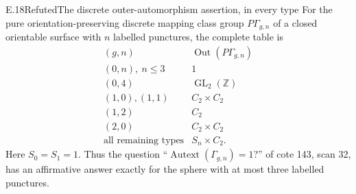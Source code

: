 \begin{result}{E.18}{Refuted}{The discrete outer-automorphism assertion, in every type}
For the pure orientation-preserving discrete mapping class group
$P\Gamma_{g,n}$ of a closed orientable surface with $n$ labelled
punctures, the complete table is
\[
\begin{array}{c|c}
(g,n)&\operatorname{Out}(P\Gamma_{g,n})\\ \hline
(0,n),\ n\leq3&1\\
(0,4)&\operatorname{GL}_2(\mathbb Z)\\
(1,0),(1,1)&C_2\times C_2\\
(1,2)&C_2\\
(2,0)&C_2\times C_2\\
\text{all remaining types}&S_n\times C_2.
\end{array}                                                     \tag{E.34}
\]
Here $S_0=S_1=1$.  Thus the question
``$\operatorname{Autext}(\Gamma_{g,n})=1$?'' of cote 143,
scan 32, has an affirmative answer exactly for the sphere
with at most three labelled punctures.
\end{result}
